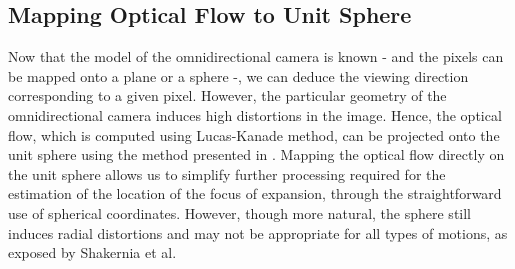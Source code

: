 \subsection{Mapping Optical Flow to Unit Sphere}
Now that the model of the omnidirectional camera is known - and the pixels can be mapped onto a plane or a sphere -, we can deduce the viewing direction corresponding to a given pixel. However, the particular geometry of the omnidirectional camera induces high distortions in the image. Hence, the optical flow, which is computed using Lucas-Kanade method, can be projected onto the unit sphere using the method presented in \cite{backproj}. Mapping the optical flow directly on the unit sphere allows us to simplify further processing required for the estimation of the location of the focus of expansion, through the straightforward use of spherical coordinates. However, though more natural, the sphere still induces radial distortions and may not be appropriate for all types of motions, as exposed by Shakernia et al.

